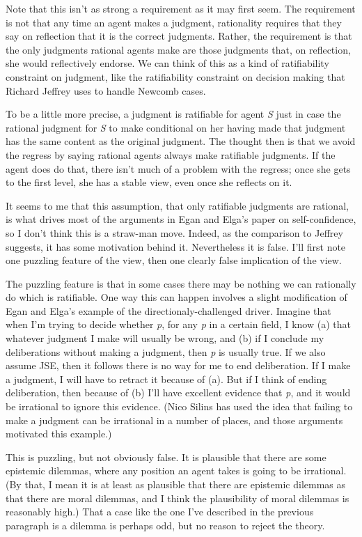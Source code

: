 \documentclass[
  11pt,
  letterpaper,
  DIV=11,
  numbers=noendperiod,
  twoside]{scrartcl}
\begin{document}
Note that this isn't as strong a requirement as it may first seem. The
requirement is not that any time an agent makes a judgment, rationality
requires that they say on reflection that it is the correct judgments.
Rather, the requirement is that the only judgments rational agents make
are those judgments that, on reflection, she would reflectively endorse.
We can think of this as a kind of ratifiability constraint on judgment,
like the ratifiability constraint on decision making that Richard
Jeffrey uses to handle Newcomb cases.

To be a little more precise, a judgment is ratifiable for agent \emph{S}
just in case the rational judgment for \emph{S} to make conditional on
her having made that judgment has the same content as the original
judgment. The thought then is that we avoid the regress by saying
rational agents always make ratifiable judgments. If the agent does do
that, there isn't much of a problem with the regress; once she gets to
the first level, she has a stable view, even once she reflects on it.

It seems to me that this assumption, that only ratifiable judgments are
rational, is what drives most of the arguments in Egan and Elga's paper
on self-confidence, so I don't think this is a straw-man move. Indeed,
as the comparison to Jeffrey suggests, it has some motivation behind it.
Nevertheless it is false. I'll first note one puzzling feature of the
view, then one clearly false implication of the view.

The puzzling feature is that in some cases there may be nothing we can
rationally do which is ratifiable. One way this can happen involves a
slight modification of Egan and Elga's example of the
directionaly-challenged driver. Imagine that when I'm trying to decide
whether \emph{p}, for any \emph{p} in a certain field, I know (a) that
whatever judgment I make will usually be wrong, and (b) if I conclude my
deliberations without making a judgment, then \emph{p} is usually true.
If we also assume JSE, then it follows there is no way for me to end
deliberation. If I make a judgment, I will have to retract it because of
(a). But if I think of ending deliberation, then because of (b) I'll
have excellent evidence that \emph{p}, and it would be irrational to
ignore this evidence. (Nico Silins has used the idea that failing to
make a judgment can be irrational in a number of places, and those
arguments motivated this example.)

This is puzzling, but not obviously false. It is plausible that there
are some epistemic dilemmas, where any position an agent takes is going
to be irrational. (By that, I mean it is at least as plausible that
there are epistemic dilemmas as that there are moral dilemmas, and I
think the plausibility of moral dilemmas is reasonably high.) That a
case like the one I've described in the previous paragraph is a dilemma
is perhaps odd, but no reason to reject the theory.
\end{document}
